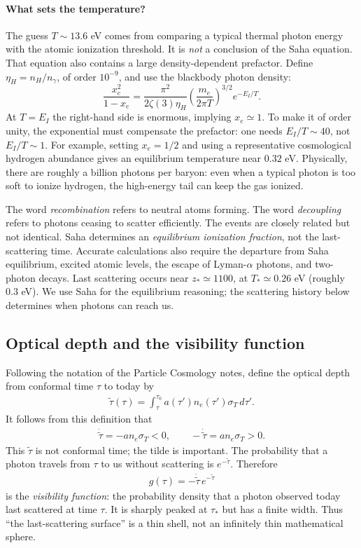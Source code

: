 \documentclass[12pt]{article}
\newcommand{\be}{\begin{eqnarray}}
\newcommand{\ee}{\end{eqnarray}}
\begin{document}
\paragraph{What sets the temperature?}
The guess $T\sim13.6$ eV comes from comparing a typical thermal photon energy with
the atomic ionization threshold. It is \emph{not} a conclusion of the Saha equation.
That equation also contains a large density-dependent prefactor. Define
$\eta_H=n_H/n_\gamma$, of order $10^{-9}$, and use the blackbody photon density:
\[
\frac{x_e^2}{1-x_e}=
\frac{\pi^2}{2\zeta(3)\eta_H}
\left(\frac{m_e}{2\pi T}\right)^{3/2}e^{-E_I/T}.
\]
At $T=E_I$ the right-hand side is enormous, implying $x_e\simeq1$. To make it of
order unity, the exponential must compensate the prefactor: one needs
$E_I/T\sim40$, not $E_I/T\sim1$. For example, setting $x_e=1/2$ and using a
representative cosmological hydrogen abundance gives an equilibrium temperature
near $0.32$ eV. Physically, there are roughly a billion photons per baryon: even
when a typical photon is too soft to ionize hydrogen, the high-energy tail can
keep the gas ionized.

The word \emph{recombination} refers to neutral atoms forming. The word \emph{decoupling}
refers to photons ceasing to scatter efficiently. The events are closely related but
not identical. Saha determines an \emph{equilibrium ionization fraction}, not the
last-scattering time. Accurate calculations also require the departure from Saha
equilibrium, excited atomic levels, the escape of Lyman-$\alpha$ photons, and
two-photon decays. Last scattering occurs near $z_*\simeq1100$, at
$T_*\simeq0.26$ eV (roughly $0.3$ eV). We use Saha for the equilibrium reasoning;
the scattering history below determines when photons can reach us.

\subsection{Optical depth and the visibility function}
Following the notation of the Particle Cosmology notes, define the optical depth from
conformal time $\tau$ to today by
\be
\tilde\tau(\tau)=\int_\tau^{\tau_0}a(\tau')n_e(\tau')\sigma_T\,d\tau'.
\label{eq:opticaldepth}
\ee
It follows from this definition that
\be
\dot{\tilde\tau}=-a n_e\sigma_T<0,
\qquad -\dot{\tilde\tau}=a n_e\sigma_T>0.
\ee
This $\tilde\tau$ is not conformal time; the tilde is important. The probability that
a photon travels from $\tau$ to us without scattering is $e^{-\tilde\tau}$. Therefore
\be
\boxed{g(\tau)=-\dot{\tilde\tau}\,e^{-\tilde\tau}}
\label{eq:visibility}
\ee
is the \emph{visibility function}: the probability density that a photon observed
today last scattered at time $\tau$. It is sharply peaked at $\tau_*$ but has a finite
width. Thus ``the last-scattering surface'' is a thin shell, not an infinitely thin
mathematical sphere.
\end{document}

